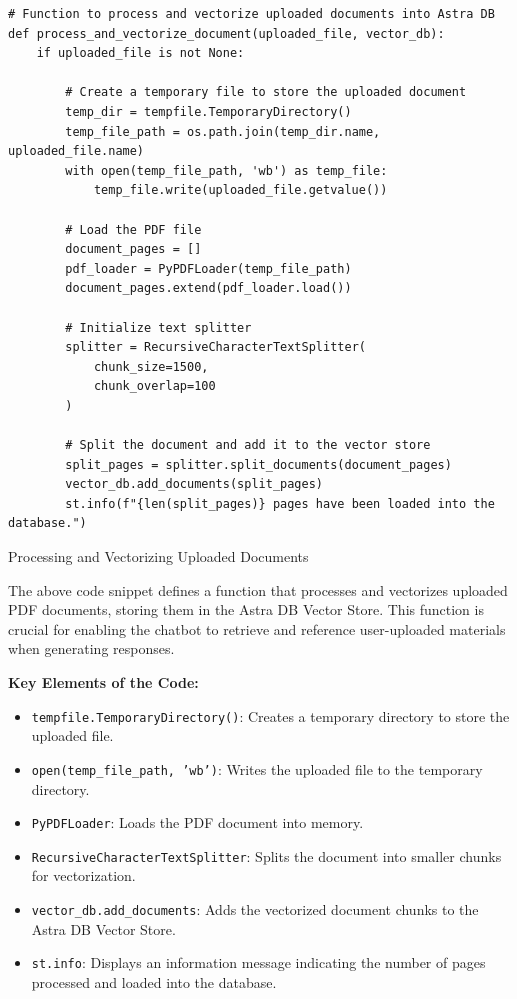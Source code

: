 \begin{listing}[H]
\begin{verbatim}
# Function to process and vectorize uploaded documents into Astra DB
def process_and_vectorize_document(uploaded_file, vector_db):
    if uploaded_file is not None:
        
        # Create a temporary file to store the uploaded document
        temp_dir = tempfile.TemporaryDirectory()
        temp_file_path = os.path.join(temp_dir.name, uploaded_file.name)
        with open(temp_file_path, 'wb') as temp_file:
            temp_file.write(uploaded_file.getvalue())

        # Load the PDF file
        document_pages = []
        pdf_loader = PyPDFLoader(temp_file_path)
        document_pages.extend(pdf_loader.load())

        # Initialize text splitter
        splitter = RecursiveCharacterTextSplitter(
            chunk_size=1500,
            chunk_overlap=100
        )

        # Split the document and add it to the vector store
        split_pages = splitter.split_documents(document_pages)
        vector_db.add_documents(split_pages)
        st.info(f"{len(split_pages)} pages have been loaded into the database.")
\end{verbatim}
\caption{Processing and Vectorizing Uploaded Documents}
\label{listing:Process_Vectorize_Documents}
\end{listing}

The above code snippet defines a function that processes and vectorizes uploaded PDF documents, storing them in the Astra DB Vector Store. This function is crucial for enabling the chatbot to retrieve and reference user-uploaded materials when generating responses.

\textbf{Key Elements of the Code:}
\begin{itemize}
    \item \texttt{tempfile.TemporaryDirectory()}: Creates a temporary directory to store the uploaded file.
    \item \texttt{open(temp\_file\_path, 'wb')}: Writes the uploaded file to the temporary directory.
    \item \texttt{PyPDFLoader}: Loads the PDF document into memory.
    \item \texttt{RecursiveCharacterTextSplitter}: Splits the document into smaller chunks for vectorization.
    \item \texttt{vector\_db.add\_documents}: Adds the vectorized document chunks to the Astra DB Vector Store.
    \item \texttt{st.info}: Displays an information message indicating the number of pages processed and loaded into the database.
\end{itemize}

